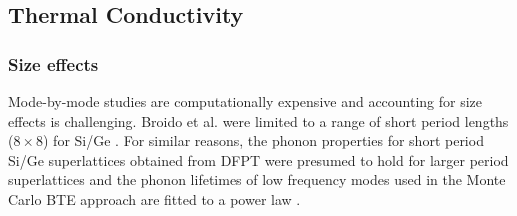 \begin{comment}
\begin{table}
\begin{center}
\begin{tabular*}{\textwidth}{c@{\extracolsep{\fill}}ccccc}
\hline\hline\noalign{\smallskip}
&\multicolumn{3}{c}{$N\times N$ Superlattice} \\
\cline{2-5}\noalign{\smallskip}
\hspace{1cm} & $2\times2$ & $4\times4$ & $8\times8$ & $14\times14$  \\
\noalign{\smallskip}\hline\noalign{\smallskip}
RMSE $\sqrt{\frac{\sum_{\pmb{\kappa}\nu}(\tau_{eff}\kv-\tau_{mixed}\kv)^2}{n}}$ &0.65 & 1.21 & 2.09 & 5.42\\
Mean $\overline{\tau_{mixed}\kv}$ &1.37 & 1.93 & 2.74 & 3.40\\
Standard Deviation $\sigma[\tau_{mixed}\kv]$ &2.34 & 2.66 & 5.53 & 11.84\\
\noalign{\smallskip}\hline\hline
\end{tabular*}
\end{center}
\renewcommand{\table}{Table.}
\caption{The root-mean-square error between Tamura theory effective lifetimes and NMD mixed lifetimes. The mean and standard deviation of the NMD mixed lifetimes are provided for context. %
}
\label{TB:taud}
\end{table}
\end{comment}

\subsection{Thermal Conductivity}

\subsubsection{Size effects}
Mode-by-mode studies are computationally expensive and accounting for size effects is challenging. Broido et al. were limited to a range of short period lengths ($8\times 8$) for Si/Ge \cite {PhysRevB.70.081310}. For similar reasons, the phonon properties for short period Si/Ge superlattices obtained from DFPT were presumed to hold for larger period superlattices \cite{Luckyanova16112012, doi:10.1021/nl202186y} and the phonon lifetimes of low frequency modes used in the Monte Carlo BTE approach are fitted to a power law \cite{savic:073113}.


